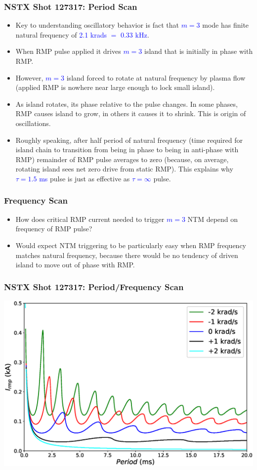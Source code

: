 \documentclass{beamer}
\newcommand{\blue}[1]{\textcolor{blue}{#1}}
\begin{document}
\begin{frame}
\frametitle{NSTX Shot 127317: Period Scan}
\begin{itemize}
\item Key to understanding oscillatory behavior is fact that \blue{$m=3$} mode has finite natural
frequency of \blue{2.1 krads $=$ 0.33 kHz}.
\item When RMP pulse applied it drives \blue{$m=3$} island that is initially in phase with RMP.
\item However, \blue{$m=3$} island forced to rotate at natural frequency by plasma flow (applied RMP is
nowhere near large enough to lock small island). 
\item As  island rotates, its phase relative to the pulse changes. In some phases, RMP causes island to grow, in others
it causes it to shrink. This is origin of oscillations. 
\item Roughly speaking, after half period of natural frequency (time required for island chain to transition from
being in  phase to being in anti-phase with RMP) remainder of RMP pulse averages to zero (because, on average,
rotating island sees net zero drive from static RMP). This explains why \blue{$\tau=1.5$ ms} pulse is just as
effective as \blue{$\tau=\infty$} pulse. 
\end{itemize}
\end{frame}

\begin{frame}
\frametitle{Frequency Scan}
\begin{itemize}
\item How does critical RMP current needed to trigger \blue{$m=3$} NTM depend on frequency of
RMP pulse? 
\item Would expect NTM triggering to be particularly easy when RMP frequency matches
natural frequency, because there would be no tendency of driven island to move out of phase with
RMP.
\end{itemize}
\end{frame}

\begin{frame}
\frametitle{NSTX Shot 127317: Period/Frequency Scan}

\begin{center}
\includegraphics[width=\textwidth]{PeriodScan.eps}
\end{center}

\end{frame}
\end{document}
